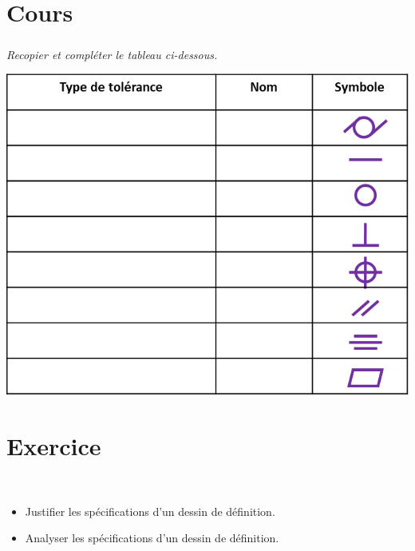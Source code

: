\documentclass[10pt,fleqn]{article} %
\begin{document}

\vspace{5cm}
\pagestyle{fancy}
\thispagestyle{plain}


\def\columnseprulecolor{\color{ocre}}
\setlength{\columnseprule}{0.4pt} 

\begin{multicols}{2}
\section*{Cours}

\subparagraph{}\textit{Recopier et compléter le tableau ci-dessous.}

\begin{center}
\includegraphics[width=.8\linewidth]{images/cours_01}
\end{center}


\section*{Exercice}
\begin{obj}~\\
\begin{itemize}
\item Justifier les spécifications d'un dessin de définition.
\item Analyser les spécifications d'un dessin de définition.
\end{itemize}
\end{obj}



\end{multicols}
\end{document}
